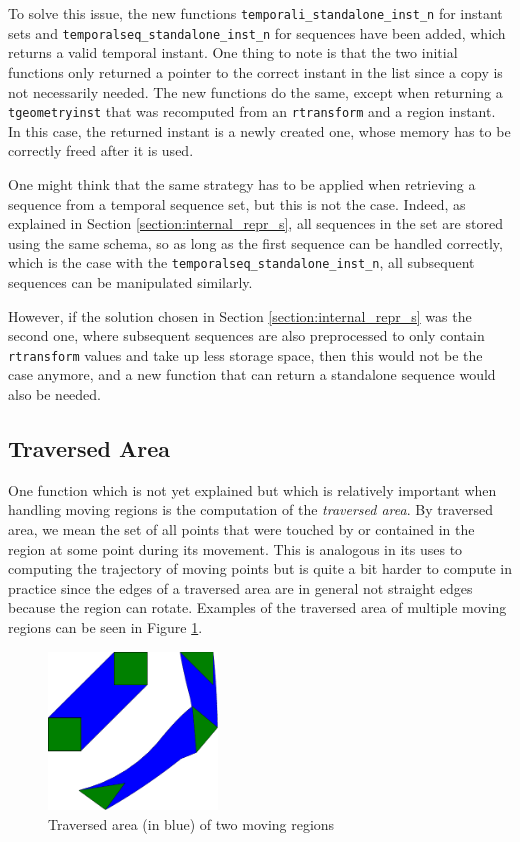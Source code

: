 To solve this issue, the new functions \lstinline{temporali_standalone_inst_n} for instant sets and \lstinline{temporalseq_standalone_inst_n} for sequences have been added, which returns a valid temporal instant. One thing to note is that the two initial functions only returned a pointer to the correct instant in the list since a copy is not necessarily needed. The new functions do the same, except when returning a \lstinline+tgeometryinst+ that was recomputed from an \lstinline+rtransform+ and a region instant. In this case, the returned instant is a newly created one, whose memory has to be correctly freed after it is used.

One might think that the same strategy has to be applied when retrieving a sequence from a temporal sequence set, but this is not the case. Indeed, as explained in Section \ref{section:internal_repr_s}, all sequences in the set are stored using the same schema, so as long as the first sequence can be handled correctly, which is the case with the \lstinline{temporalseq_standalone_inst_n}, all subsequent sequences can be manipulated similarly.

However, if the solution chosen in Section \ref{section:internal_repr_s} was the second one, where subsequent sequences are also preprocessed to only contain \lstinline+rtransform+ values and take up less storage space, then this would not be the case anymore, and a new function that can return a standalone sequence would also be needed.

\subsection{Traversed Area}
\label{section:traversed_area}

One function which is not yet explained but which is relatively important when handling moving regions is the computation of the \textit{traversed area}. By traversed area, we mean the set of all points that were touched by or contained in the region at some point during its movement. This is analogous in its uses to computing the trajectory of moving points but is quite a bit harder to compute in practice since the edges of a traversed area are in general not straight edges because the region can rotate. Examples of the traversed area of multiple moving regions can be seen in Figure \ref{fig:traversed_area_examples}.

\begin{figure}[h!]
    \centering
    \includegraphics[width=0.4\textwidth]{images/traversed_area_example.pdf}
    \caption[Traversed area of two moving regions]{Traversed area (in blue) of two moving regions}
    \label{fig:traversed_area_examples}
\end{figure}


